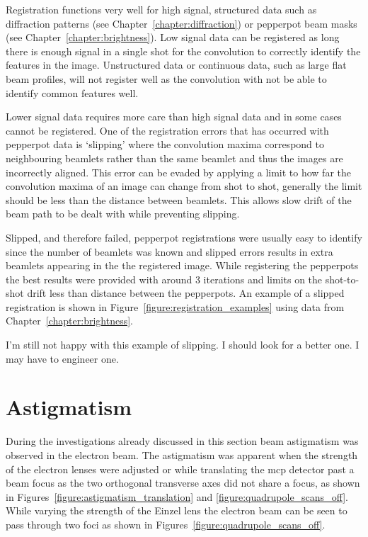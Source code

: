 Registration functions very well for high signal, structured data such as diffraction patterns (see Chapter~\ref{chapter:diffraction}) or pepperpot beam masks (see Chapter~\ref{chapter:brightness}).
Low signal data can be registered as long there is enough signal in a single shot for the convolution to correctly identify the features in the image.
Unstructured data or continuous data, such as large flat beam profiles, will not register well as the convolution with not be able to identify common features well.

Lower signal data requires more care than high signal data and in some cases cannot be registered.
One of the registration errors that has occurred with pepperpot data is `slipping' where the convolution maxima correspond to neighbouring beamlets rather than the same beamlet and thus the images are incorrectly aligned.
This error can be evaded by applying a limit to how far the convolution maxima of an image can change from shot to shot, generally the limit should be less than the distance between beamlets.
This allows slow drift of the beam path to be dealt with while preventing slipping.

Slipped, and therefore failed, pepperpot registrations were usually easy to identify since the number of beamlets was known and slipped errors results in extra beamlets appearing in the the registered image.
While registering the pepperpots the best results were provided with around 3 iterations and limits on the shot-to-shot drift less than distance between the pepperpots.
An example of a slipped registration is shown in Figure~\ref{figure:registration_examples} using data from Chapter~\ref{chapter:brightness}.

{\color{red} I'm still not happy with this example of slipping. I should look for a better one. I may have to engineer one.}

\section{Astigmatism}\label{section:quadrupole}

During the investigations already discussed in this section beam astigmatism was observed in the electron beam.
The astigmatism was apparent when the strength of the electron lenses were adjusted or while translating the \gls{mcp} detector past a beam focus as the two orthogonal transverse axes did not share a focus, as shown in Figures~\ref{figure:astigmatism_translation} and \ref{figure:quadrupole_scans_off}.
While varying the strength of the Einzel lens the electron beam can be seen to pass through two foci as shown in Figures~\ref{figure:quadrupole_scans_off}.

